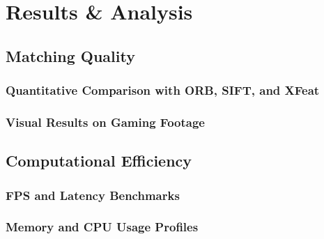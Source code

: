 \chapter{Results \& Analysis}
\section{Matching Quality}
\subsection{Quantitative Comparison with ORB, SIFT, and XFeat}
\subsection{Visual Results on Gaming Footage}

\section{Computational Efficiency}
\subsection{FPS and Latency Benchmarks}
\subsection{Memory and CPU Usage Profiles}

